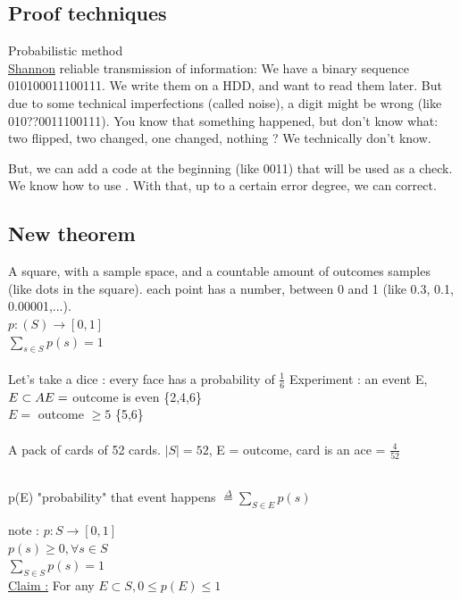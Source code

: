 \documentclass[12pt,a4paper]{article}
\begin{document}
\subsection{Proof techniques}
Probabilistic method\\
\underline{Shannon} reliable transmission of information:
We have a binary sequence  010100011100111. We write them on a HDD, and want to read them later. But due to some technical imperfections (called noise), a digit might be wrong (like 010??0011100111). You know that something happened, but don't know what: two flipped, two changed, one changed, nothing ? We technically don't know. 

But, we can add a code at the beginning (like 0011) that will be used as a check. We know how to use . With that, up to a certain error degree, we can correct.

\subsection{New theorem}
A square, with a sample space, and a countable amount of outcomes samples (like dots in the square). each point has a number, between 0 and 1 (like 0.3, 0.1, 0.00001,...). \\
$p:(S) \to [0,1]$\\
$\sum\limits_{s\in S}p(s) = 1$\\
\\
Let's take a dice : every face has a probability of $\frac{1}{6}$
Experiment : an event E, $E \subset A\\
E =$ outcome is even \{2,4,6\}\\
$E =$ outcome $\geq 5$ \{5,6\}\\
\\
 A pack of cards of 52 cards. $|S| = 52$, E = outcome, card is an ace = $\frac{4}{52}$\\
\\
\begin{boite}[0.65]
p(E) "probability" that event happens $\overset{\Delta}{=} \sum\limits_{S\in E} p(s)$
\end{boite} 
note : $p:S \to [0,1]$\\
$p(s) \geq 0, \forall s \in S$\\
$\sum\limits_{S\in S} p(s) = 1$\\
\underline{Claim :} For any $E \subset S, 0 \leq p(E) \leq 1$
\end{document}
